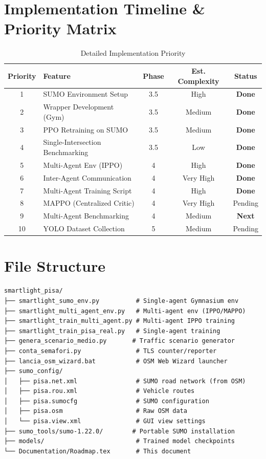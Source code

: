 \documentclass[a4paper,11pt]{article}
\begin{document}
\section{Implementation Timeline \& Priority Matrix}

\begin{table}[H]
    \centering
    \begin{tabular}{clccc}
        \toprule
        \textbf{Priority} & \textbf{Feature} & \textbf{Phase} & \textbf{Est. Complexity} & \textbf{Status} \\
        \midrule
        1 & SUMO Environment Setup & 3.5 & High & \textbf{Done} \\
        2 & Wrapper Development (Gym) & 3.5 & Medium & \textbf{Done} \\
        3 & PPO Retraining on SUMO & 3.5 & Medium & \textbf{Done} \\
        4 & Single-Intersection Benchmarking & 3.5 & Low & \textbf{Done} \\
        5 & Multi-Agent Env (IPPO) & 4 & High & \textbf{Done} \\
        6 & Inter-Agent Communication & 4 & Very High & \textbf{Done} \\
        7 & Multi-Agent Training Script & 4 & High & \textbf{Done} \\
        8 & MAPPO (Centralized Critic) & 4 & Very High & Pending \\
        9 & Multi-Agent Benchmarking & 4 & Medium & \textbf{Next} \\
        10 & YOLO Dataset Collection & 5 & Medium & Pending \\
        \bottomrule
    \end{tabular}
    \caption{Detailed Implementation Priority}
\end{table}

\section{File Structure}
\begin{verbatim}
smartlight_pisa/
├── smartlight_sumo_env.py          # Single-agent Gymnasium env
├── smartlight_multi_agent_env.py   # Multi-agent env (IPPO/MAPPO)
├── smartlight_train_multi_agent.py # Multi-agent IPPO training
├── smartlight_train_pisa_real.py   # Single-agent training
├── genera_scenario_medio.py       # Traffic scenario generator
├── conta_semafori.py               # TLS counter/reporter
├── lancia_osm_wizard.bat           # OSM Web Wizard launcher
├── sumo_config/
│   ├── pisa.net.xml                # SUMO road network (from OSM)
│   ├── pisa.rou.xml                # Vehicle routes
│   ├── pisa.sumocfg                # SUMO configuration
│   ├── pisa.osm                    # Raw OSM data
│   └── pisa.view.xml               # GUI view settings
├── sumo_tools/sumo-1.22.0/        # Portable SUMO installation
├── models/                         # Trained model checkpoints
└── Documentation/Roadmap.tex       # This document
\end{verbatim}
\end{document}
